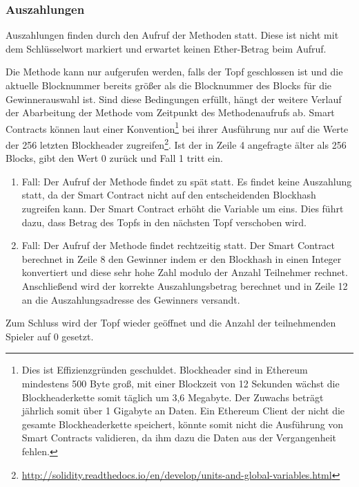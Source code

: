 \subsubsection{Auszahlungen}\label{sssec:eth_nbrOfMissedPayouts}
Auszahlungen finden durch den Aufruf der  Methoden statt. Diese ist nicht mit dem Schlüsselwort  markiert und erwartet keinen Ether-Betrag beim Aufruf.

Die Methode kann nur aufgerufen werden, falls der Topf geschlossen ist und die aktuelle Blocknummer bereits größer als die Blocknummer des Blocks für die Gewinnerauswahl ist. Sind diese Bedingungen erfüllt, hängt der weitere Verlauf der Abarbeitung der  Methode vom Zeitpunkt des Methodenaufrufs ab. Smart Contracts können laut einer Konvention\footnote{Dies ist Effizienzgründen geschuldet. Blockheader sind in Ethereum mindestens 500 Byte groß, mit einer Blockzeit von 12 Sekunden wächst die Blockheaderkette somit täglich um 3,6 Megabyte. Der Zuwachs beträgt jährlich somit über 1 Gigabyte an Daten. Ein Ethereum Client der nicht die gesamte Blockheaderkette speichert, könnte somit nicht die Ausführung von Smart Contracts validieren, da ihm dazu die Daten aus der Vergangenheit fehlen.} bei ihrer Ausführung nur auf die Werte der 256 letzten Blockheader zugreifen\footnote{\url{http://solidity.readthedocs.io/en/develop/units-and-global-variables.html}}. Ist der in Zeile 4 angefragte  älter als 256 Blocks, gibt  den Wert 0 zurück und Fall 1 tritt ein.
\begin{enumerate}
\item Fall: Der Aufruf der  Methode findet zu spät statt. Es findet keine Auszahlung statt, da der Smart Contract nicht auf den entscheidenden Blockhash zugreifen kann. Der Smart Contract erhöht die  Variable um eins. Dies führt dazu, dass Betrag des Topfs in den nächsten Topf verschoben wird. 
\item Fall: Der Aufruf der  Methode findet rechtzeitig statt. Der Smart Contract berechnet in Zeile 8 den Gewinner indem er den Blockhash in einen Integer konvertiert und diese sehr hohe Zahl modulo der Anzahl Teilnehmer rechnet. Anschließend wird der korrekte Auszahlungsbetrag berechnet und in Zeile 12 an die Auszahlungsadresse des Gewinners versandt.
\end{enumerate}
Zum Schluss wird der Topf wieder geöffnet und die Anzahl der teilnehmenden Spieler auf 0 gesetzt.

